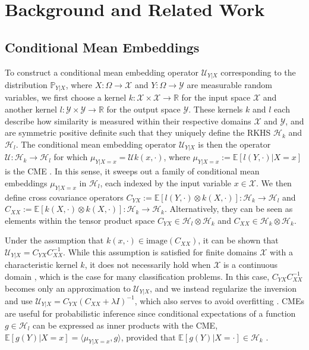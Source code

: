 \documentclass[runningheads, envcountsame, a4paper]{llncs}
\begin{document}
	\section{Background and Related Work}
	\label{sec:background}
	
		\subsection{Conditional Mean Embeddings}
	
			To construct a conditional mean embedding operator $\mathcal{U}_{Y | X}$ corresponding to the distribution $\mathbb{P}_{Y | X}$, where $X : \Omega \to \mathcal{X}$ and $Y: \Omega \to \mathcal{Y}$ are measurable random variables, we first choose a kernel $k : \mathcal{X} \times \mathcal{X} \to \mathbb{R}$ for the input space $\mathcal{X}$ and another kernel $l : \mathcal{Y} \times \mathcal{Y} \to \mathbb{R}$ for the output space $\mathcal{Y}$. These kernels $k$ and $l$ each describe how similarity is measured within their respective domains $\mathcal{X}$ and $\mathcal{Y}$, and are symmetric positive definite such that they uniquely define the \gls{RKHS} $\mathcal{H}_{k}$ and $\mathcal{H}_{l}$. The conditional mean embedding operator $\mathcal{U}_{Y | X}$ is then the operator $\mathcal{U} : \mathcal{H}_{k} \to \mathcal{H}_{l}$ for which $\mu_{Y | X = x} = \mathcal{U} k(x, \cdot)$, where $\mu_{Y | X = x} := \mathbb{E}[l(Y, \cdot) | X = x]$ is the \gls{CME} \citep{song2009hilbert}. In this sense, it sweeps out a family of conditional mean embeddings $\mu_{Y | X = x}$ in $\mathcal{H}_{l}$, each indexed by the input variable $x \in \mathcal{X}$. We then define cross covariance operators $C_{YX} := \mathbb{E}[l(Y, \cdot) \otimes k(X, \cdot)] : \mathcal{H}_{k} \to \mathcal{H}_{l}$ and $C_{XX} := \mathbb{E}[k(X, \cdot) \otimes k(X, \cdot)] : \mathcal{H}_{k} \to \mathcal{H}_{k}$. Alternatively, they can be seen as elements within the tensor product space $C_{YX} \in \mathcal{H}_{l} \otimes \mathcal{H}_{k}$ and $C_{XX} \in \mathcal{H}_{k} \otimes \mathcal{H}_{k}$.
		
			Under the assumption that $k(x, \cdot) \in \mathrm{image}(C_{XX})$, it can be shown that $\mathcal{U}_{Y | X} = C_{YX} C_{XX}^{-1}$. While this assumption is satisfied for finite domains $\mathcal{X}$ with a characteristic kernel $k$, it does not necessarily hold when $\mathcal{X}$ is a continuous domain \citep{fukumizu2004dimensionality}, which is the case for many classification problems. In this case, $C_{YX} C_{XX}^{-1}$ becomes only an approximation to $\mathcal{U}_{Y | X}$, and we instead regularize the inversion and use $\mathcal{U}_{Y | X} = C_{YX} (C_{XX} + \lambda I)^{-1}$, which also serves to avoid overfitting \citep{song2013kernel}. \glspl{CME} are useful for probabilistic inference since conditional expectations of a function $g \in \mathcal{H}_{l}$ can be expressed as inner products with the \gls{CME}, $\mathbb{E}[g(Y) | X = x] = \langle \mu_{Y | X = x}, g \rangle$, provided that $\mathbb{E}[g(Y) | X = \cdot] \in \mathcal{H}_{k}$ \citep[Theorem 4]{song2009hilbert}.
		
\end{document}
